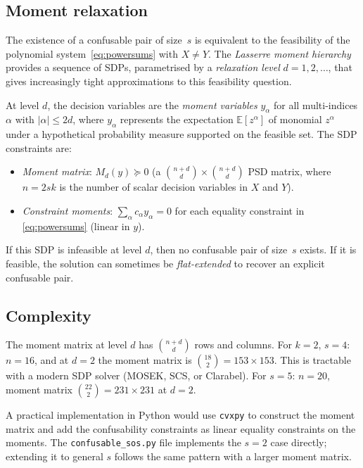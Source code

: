 \documentclass[12pt,a4paper]{article}
\begin{document}
\subsection*{Moment relaxation}

The existence of a confusable pair of size~$s$ is equivalent to the
feasibility of the polynomial system~\eqref{eq:powersums} with
$X \neq Y$.  The \emph{Lasserre moment hierarchy} provides a sequence of
SDPs, parametrised by a \emph{relaxation level} $d = 1, 2, \ldots$, that
gives increasingly tight approximations to this feasibility question.

At level $d$, the decision variables are the \emph{moment variables}
$y_\alpha$ for all multi-indices $\alpha$ with $|\alpha| \leq 2d$, where
$y_\alpha$ represents the expectation $\mathbb{E}[z^\alpha]$ of monomial
$z^\alpha$ under a hypothetical probability measure supported on the
feasible set.  The SDP constraints are:
\begin{itemize}
  \item \emph{Moment matrix}: $M_d(y) \succeq 0$ (a $\binom{n+d}{d}
    \times \binom{n+d}{d}$ PSD matrix, where $n = 2sk$ is the number of
    scalar decision variables in $X$ and $Y$).
  \item \emph{Constraint moments}: $\sum_\alpha c_\alpha y_\alpha = 0$
    for each equality constraint in \eqref{eq:powersums} (linear in $y$).
\end{itemize}
If this SDP is infeasible at level $d$, then no confusable pair of
size~$s$ exists.  If it is feasible, the solution can sometimes be
\emph{flat-extended} to recover an explicit confusable pair.

\subsection*{Complexity}

The moment matrix at level $d$ has $\binom{n+d}{d}$ rows and columns.
For $k = 2$, $s = 4$: $n = 16$, and at $d = 2$ the moment matrix is
$\binom{18}{2} = 153 \times 153$.  This is tractable with a modern SDP
solver (MOSEK, SCS, or Clarabel).  For $s = 5$: $n = 20$, moment matrix
$\binom{22}{2} = 231 \times 231$ at $d = 2$.

A practical implementation in Python would use \texttt{cvxpy} to
construct the moment matrix and add the confusability constraints as
linear equality constraints on the moments.  The
\texttt{confusable\_sos.py} file implements the $s = 2$ case directly;
extending it to general $s$ follows the same pattern with a larger
moment matrix.
\end{document}
